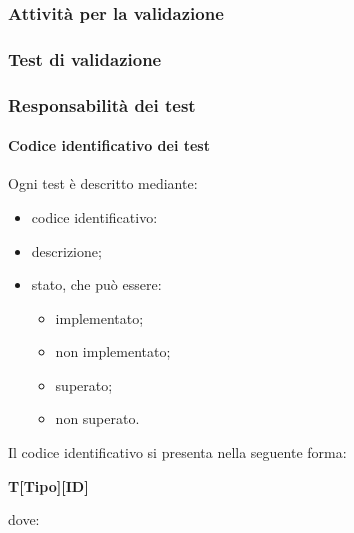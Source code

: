 \subsubsection{Attività per la validazione}

\subsubsection{Test di validazione}

\subsubsection{Responsabilità dei test}

\paragraph{Codice identificativo dei test}
Ogni test è descritto mediante:
\begin{itemize}
    \item codice identificativo:
    \item descrizione;
    \item stato, che può essere:
    \begin{itemize}
        \item implementato;
        \item non implementato;
        \item superato;
        \item non superato.
    \end{itemize}
\end{itemize}
Il codice identificativo si presenta nella seguente forma:
\begin{center}
    \textbf{T[Tipo][ID]}
\end{center}
dove:
